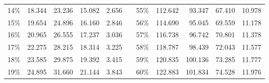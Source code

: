 \documentclass[12pt]{article}
\begin{document}
\begin{center}
\begin{tabular}{|c|r|r|r|r|r|c|r|r|r|r|}
    14\%                      & 18.344                             & 23.236                              & 15.082                              & 2.656                              &                                & 55\%                      & 112.642                            & 93.347                              & 67.410                              & 10.978                             \\ \cline{1-5} \cline{7-11} 
    15\%                      & 19.654                             & 24.896                              & 16.160                              & 2.846                              &                                & 56\%                      & 114.690                            & 95.045                              & 69.559                              & 11.178                             \\ \cline{1-5} \cline{7-11} 
    16\%                      & 20.965                             & 26.555                              & 17.237                              & 3.036                              &                                & 57\%                      & 116.738                            & 96.742                              & 70.801                              & 11.378                             \\ \cline{1-5} \cline{7-11} 
    17\%                      & 22.275                             & 28.215                              & 18.314                              & 3.225                              &                                & 58\%                      & 118.787                            & 98.439                              & 72.043                              & 11.577                             \\ \cline{1-5} \cline{7-11} 
    18\%                      & 23.585                             & 29.875                              & 19.392                              & 3.415                              &                                & 59\%                      & 120.835                            & 100.136                             & 73.285                              & 11.777                             \\ \cline{1-5} \cline{7-11} 
    19\%                      & 24.895                             & 31.660                              & 21.144                              & 3.843                              &                                & 60\%                      & 122.883                            & 101.834                             & 74.528                              & 11.976                             \\ \cline{1-5} \cline{7-11} 

\end{tabular}
\end{center}
\end{document}
